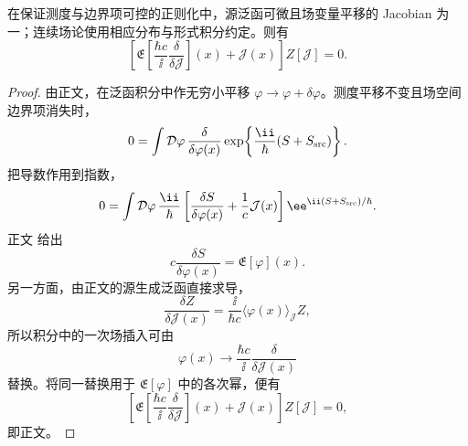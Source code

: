 \begin{proposition}[泛函分部积分的主恒等式]
在保证测度与边界项可控的正则化中，源泛函可微且场变量平移的 Jacobian 为一；连续场论使用相应分布与形式积分约定。则有
\begin{equation}
 {
 \left[
 \mathfrak E\!\left[
 \frac{\hbar c}{\ii}\frac{\delta}{\delta\mathcal J}
 \right](x)
 +\mathcal J(x)
 \right]Z[\mathcal J]=0.}
\label{eq:SD-master-SI-r12}
\end{equation}
\end{proposition}
\begin{proof}
由正文，在泛函积分中作无穷小平移 $\varphi\to\varphi+\delta\varphi$。测度平移不变且场空间边界项消失时，
\begin{equation*}
 0=
 \int\mathcal D\varphi\,
 \frac{\delta}{\delta\varphi(x)}
 \exp\!\left\{
 \frac{\ii}{\hbar}(S+S_{\rm src})
 \right\}.
\end{equation*}
把导数作用到指数，
\begin{equation*}
 0=
 \int\mathcal D\varphi\,
 \frac{\ii}{\hbar}
 \left[
 \frac{\delta S}{\delta\varphi(x)}
 +\frac1c\mathcal J(x)
 \right]
 \ee^{\ii(S+S_{\rm src})/\hbar}.
\end{equation*}
正文 给出
\begin{equation*}
 c\frac{\delta S}{\delta\varphi(x)}
 =\mathfrak E[\varphi](x).
\end{equation*}
另一方面，由正文的源生成泛函直接求导，
\begin{equation*}
 \frac{\delta Z}{\delta\mathcal J(x)}
 =\frac{\ii}{\hbar c}
 \langle\varphi(x)\rangle_{\mathcal J}Z,
\end{equation*}
所以积分中的一次场插入可由
\begin{equation*}
 \varphi(x)\longrightarrow
 \frac{\hbar c}{\ii}\frac{\delta}{\delta\mathcal J(x)}
\end{equation*}
替换。将同一替换用于 $\mathfrak E[\varphi]$ 中的各次幂，便有
\begin{equation*}
 \left[
 \mathfrak E\!\left[
 \frac{\hbar c}{\ii}\frac{\delta}{\delta\mathcal J}
 \right](x)
 +\mathcal J(x)
 \right]Z[\mathcal J]=0,
\end{equation*}
即正文。
\end{proof}

